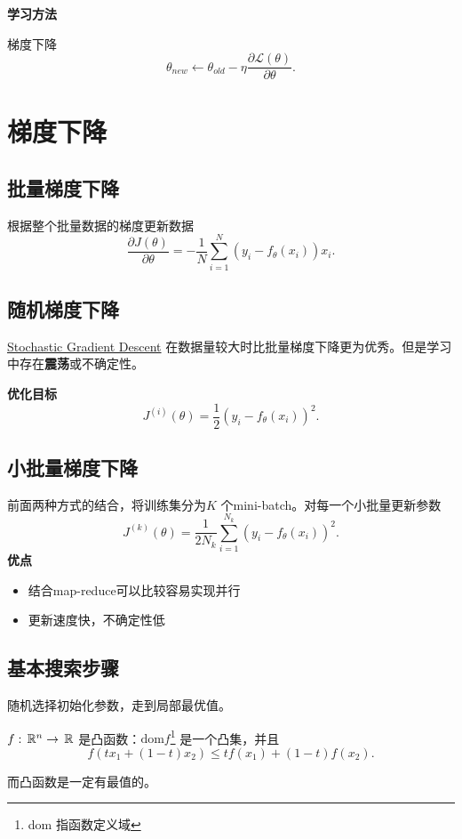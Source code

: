\noindent \textbf{学习方法}

梯度下降
\[
		\theta_{new} \leftarrow \theta_{old} - \eta \frac{\partial \mathcal{L}\left( \theta \right) }{\partial \theta} 
.\] 

\section{梯度下降}
\subsection{批量梯度下降}
根据整个批量数据的梯度更新数据
\[
		\frac{\partial J\left( \theta \right) }{\partial \theta} =
		-\frac{1}{N} \sum_{i=1}^{N} \left( y_{i}-f_{\theta}\left( x_{i} \right)  \right) x_{i}
.\] 

\subsection{随机梯度下降}
\href{https://en.wikipedia.org/wiki/Stochastic_gradient_descent}{Stochastic Gradient Descent} 
在数据量较大时比批量梯度下降更为优秀。但是学习中存在\textbf{震荡}或不确定性。 

\noindent \textbf{优化目标}
\[
		J^{(i)} \left( \theta \right) = \frac{1}{2} \left( y_{i}-f_{\theta}\left( x_{i} \right)   \right) ^2 
.\] 
\subsection{小批量梯度下降}
前面两种方式的结合，将训练集分为$K$ 个mini-batch。对每一个小批量更新参数
\[
		J^{(k)}\left( \theta \right)  = \frac{1}{2N_{k}} \sum_{i=1}^{N_k} \left( y_i-f_{\theta}\left( x_{i} \right)  \right) ^2
.\] 
\noindent \textbf{优点}
\begin{itemize}
		\item 结合map-reduce可以比较容易实现并行
		\item 更新速度快，不确定性低
\end{itemize}

\subsection{基本搜索步骤}
随机选择初始化参数，走到局部最优值。

\begin{defi}
		$f:\,\mathbb{R}^{n}\to \,\mathbb{R}$ 是凸函数：$\mathrm{dom} f$\footnote{dom 指函数定义域} 是一个凸集，并且
		\[
				f\left( tx_1+\left( 1-t \right) x_2 \right) \le  tf\left( x_1 \right) 
				+ \left( 1-t \right) f\left( x_2 \right) 
		.\] 
\end{defi}
而凸函数是一定有最值的。

